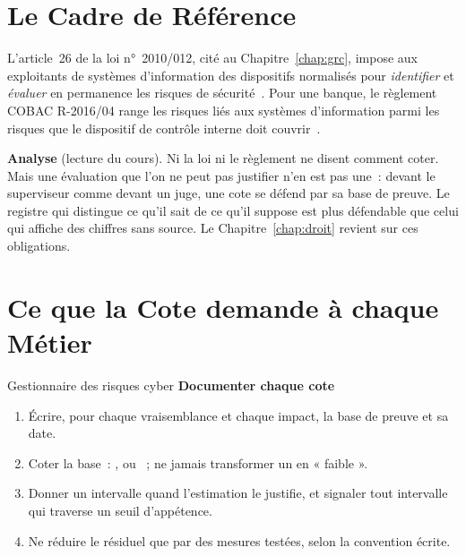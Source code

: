 \section{Le Cadre de Référence}
\label{sec:c02-cadre}

L'article~26 de la loi n°~2010/012, cité au Chapitre~\ref{chap:grc}, impose
aux exploitants de systèmes d'information des dispositifs normalisés pour
\emph{identifier} et \emph{évaluer} en permanence les risques de
sécurité~\cite{loi2010012}. Pour une banque, le règlement COBAC R-2016/04
range les risques liés aux systèmes d'information parmi les risques que le
dispositif de contrôle interne doit couvrir~\cite{cobac2016r04}.

\begin{boxinfo}
\textbf{Analyse} (lecture du cours). Ni la loi ni le règlement ne disent
comment coter. Mais une évaluation que l'on ne peut pas justifier n'en est
pas une~: devant le superviseur comme devant un juge, une cote se défend
par sa base de preuve. Le registre qui distingue ce qu'il sait de ce qu'il
suppose est plus défendable que celui qui affiche des chiffres sans
source. Le Chapitre~\ref{chap:droit} revient sur ces obligations.
\end{boxinfo}

\section{Ce que la Cote demande à chaque Métier}
\label{sec:c02-metiers}

\begin{boxmetier}{Gestionnaire des risques cyber}
\textbf{Documenter chaque cote}
\begin{enumerate}
    \item Écrire, pour chaque vraisemblance et chaque impact, la base de
          preuve et sa date.
    \item Coter la base~: \OUI{}, \NON{} ou \NEK{}~; ne jamais transformer
          un \NEK{} en « faible ».
    \item Donner un intervalle quand l'estimation le justifie, et signaler
          tout intervalle qui traverse un seuil d'appétence.
    \item Ne réduire le résiduel que par des mesures testées, selon la
          convention écrite.
\end{enumerate}
\end{boxmetier}


